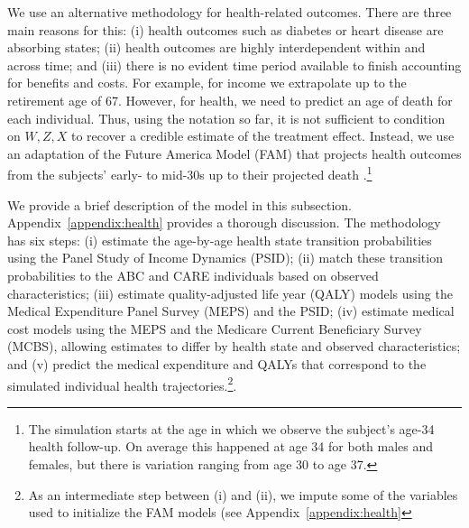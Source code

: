 We use an alternative methodology for health-related outcomes. There are three main reasons for this: (i) health outcomes such as diabetes or heart disease are absorbing states; (ii) health outcomes are highly interdependent within and across time; and (iii) there is no evident time period available to finish accounting for benefits and costs. For example, for income we extrapolate up to the retirement age of 67. However, for health, we need to predict an age of death for each individual. Thus, using the notation so far, it is not sufficient to condition on $W, Z, X$ to recover a credible estimate of the treatment effect. Instead, we use an adaptation of the Future America Model (FAM) that projects health outcomes from the subjects' early- to mid-30s up to their projected death \citep{Goldman_etal_2015_Future-Elderly-Model-Report}.\footnote{The simulation starts at the age in which we observe the subject's age-34 health follow-up. On average this happened at age 34 for both males and females, but there is variation ranging from age 30 to age 37.}

We provide a brief description of the model in this subsection. Appendix~\ref{appendix:health} provides a thorough discussion. The methodology has six steps: (i) estimate the age-by-age health state transition probabilities using the Panel Study of Income Dynamics (PSID); (ii) match these transition probabilities to the ABC and CARE individuals based on observed characteristics; (iii) estimate quality-adjusted life year (QALY) models using the Medical Expenditure Panel Survey (MEPS) and the PSID; (iv) estimate medical cost models using the MEPS and the Medicare Current Beneficiary Survey (MCBS), allowing estimates to differ by health state and observed characteristics; and (v) predict the medical expenditure and QALYs that correspond to the simulated individual health trajectories.\footnote{As an intermediate step between (i) and (ii), we impute some of the variables used to initialize the FAM models (see Appendix~\ref{appendix:health}}.

